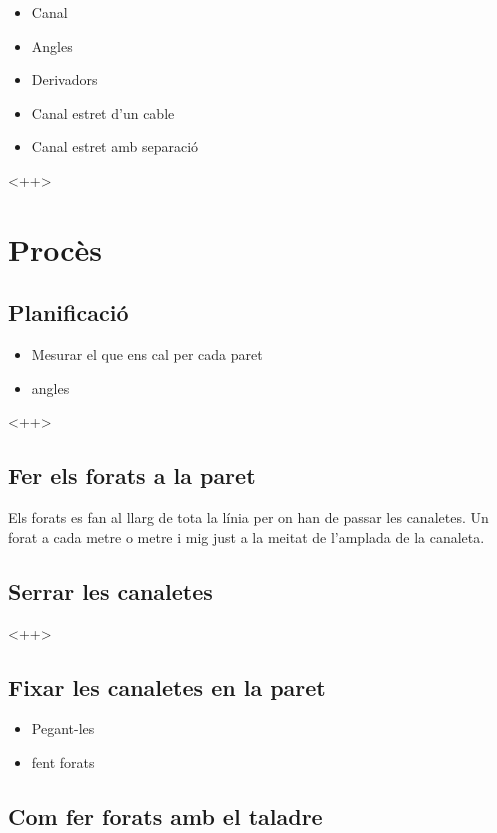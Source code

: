\documentclass[a4paper]{article}
\begin{document}
\begin{itemize}
	\item Canal
	\item Angles
	\item Derivadors
	\item Canal estret d'un cable
	\item Canal estret amb separació
\end{itemize}<++>

\section{Procès}

\subsection{Planificació}

\begin{itemize}
	\item Mesurar el que ens cal per cada paret
	\item angles
\end{itemize}<++>

\subsection{Fer els forats a la paret}

Els forats es fan al llarg de tota la línia per on han de passar les canaletes. Un forat a cada metre o metre i mig just a la meitat de l'amplada de la canaleta.

\subsection{Serrar les canaletes}<++>

\subsection{Fixar les canaletes en la paret}

\begin{itemize}
	\item Pegant-les
	\item fent forats
\end{itemize}

\subsection{Com fer forats amb el taladre}
\end{document}
